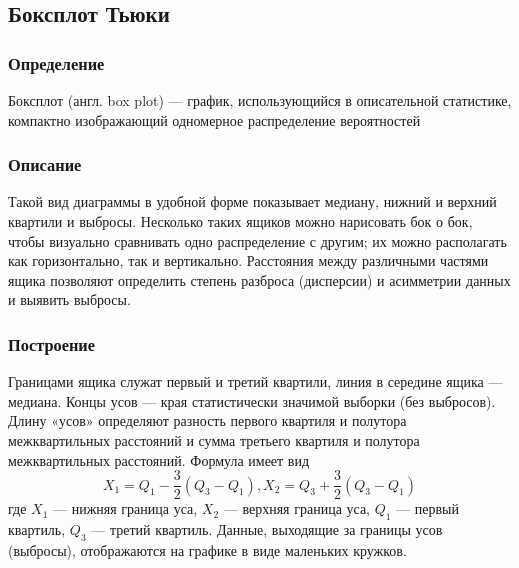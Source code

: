 \subsection{Боксплот Тьюки}
\subsubsection{Определение}
Боксплот (англ. box plot) — график, использующийся в описательной статистике, компактно изображающий одномерное распределение вероятностей

\subsubsection{Описание}
Такой вид диаграммы в удобной форме показывает медиану, нижний и верхний квартили и выбросы. Несколько таких ящиков можно нарисовать бок о бок, чтобы визуально сравнивать одно распределение с другим; их можно располагать как горизонтально, так и вертикально. Расстояния между различными частями ящика позволяют определить степень разброса (дисперсии) и асимметрии данных и выявить выбросы.

\subsubsection{Построение}
Границами ящика служат первый и третий квартили, линия в середине ящика — медиана. Концы усов — края статистически значимой выборки (без выбросов). Длину «усов» определяют разность первого квартиля и полутора межквартильных расстояний и сумма третьего квартиля и полутора межквартильных расстояний. Формула имеет вид
\begin{equation}
{X_1 = Q_1-} \frac{3}{2}{(Q_3 - Q_1)},   {X_2 = Q_3+} \frac{3}{2}{(Q_3 - Q_1)}
\end{equation}
где $X_1$ — нижняя граница уса, $X_2$ — верхняя граница уса, $Q_1$ — первый квартиль, $Q_3$ — третий квартиль. Данные, выходящие за границы усов (выбросы), отображаются на графике в виде маленьких кружков.


